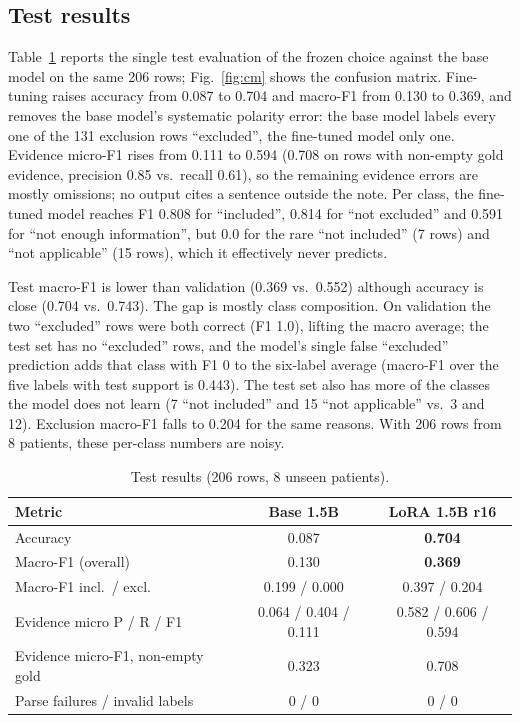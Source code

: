 \documentclass[conference]{IEEEtran}
\begin{document}
\subsection{Test results}
Table~\ref{tab:test} reports the single test evaluation of the frozen choice against the base model on the same 206 rows; Fig.~\ref{fig:cm} shows the confusion matrix. Fine-tuning raises accuracy from 0.087 to 0.704 and macro-F1 from 0.130 to 0.369, and removes the base model's systematic polarity error: the base model labels every one of the 131 exclusion rows ``excluded'', the fine-tuned model only one. Evidence micro-F1 rises from 0.111 to 0.594 (0.708 on rows with non-empty gold evidence, precision 0.85 vs.\ recall 0.61), so the remaining evidence errors are mostly omissions; no output cites a sentence outside the note. Per class, the fine-tuned model reaches F1 0.808 for ``included'', 0.814 for ``not excluded'' and 0.591 for ``not enough information'', but 0.0 for the rare ``not included'' (7 rows) and ``not applicable'' (15 rows), which it effectively never predicts.

Test macro-F1 is lower than validation (0.369 vs.\ 0.552) although accuracy is close (0.704 vs.\ 0.743). The gap is mostly class composition. On validation the two ``excluded'' rows were both correct (F1 1.0), lifting the macro average; the test set has no ``excluded'' rows, and the model's single false ``excluded'' prediction adds that class with F1 0 to the six-label average (macro-F1 over the five labels with test support is 0.443). The test set also has more of the classes the model does not learn (7 ``not included'' and 15 ``not applicable'' vs.\ 3 and 12). Exclusion macro-F1 falls to 0.204 for the same reasons. With 206 rows from 8 patients, these per-class numbers are noisy.

\begin{table}[t]
\centering
\caption{Test results (206 rows, 8 unseen patients).}
\label{tab:test}
\footnotesize
\setlength{\tabcolsep}{3pt}
\begin{tabular}{lcc}
\toprule
Metric & Base 1.5B & LoRA 1.5B r16 \\
\midrule
Accuracy & 0.087 & \textbf{0.704} \\
Macro-F1 (overall) & 0.130 & \textbf{0.369} \\
Macro-F1 incl.\ / excl. & 0.199 / 0.000 & 0.397 / 0.204 \\
Evidence micro P / R / F1 & 0.064 / 0.404 / 0.111 & 0.582 / 0.606 / 0.594 \\
Evidence micro-F1, non-empty gold & 0.323 & 0.708 \\
Parse failures / invalid labels & 0 / 0 & 0 / 0 \\
\bottomrule
\end{tabular}
\end{table}
\end{document}
